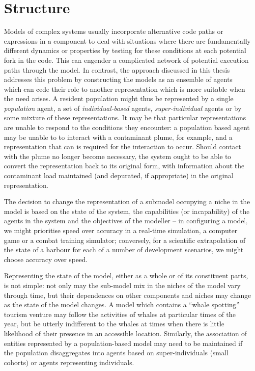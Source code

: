 \section{Structure }
Models of complex systems usually incorporate alternative code paths
or expressions in a component to deal with situations where there are
fundamentally different dynamics or properties by testing for these
conditions at each potential fork in the code. This can engender a
complicated network of potential execution paths through the model.
In contrast, the approach discussed in this thesis addresses this
problem by constructing the models as an ensemble of agents which can
cede their role to another representation which is more suitable when
the need arises.  A resident population might thus be represented by a
single \emph{population\/} agent, a set of \emph{individual-based\/}
agents, \emph{super-individual\/} agents or by some mixture of these
representations.  It may be that particular representations are unable
to respond to the conditions they encounter: a population based agent
may be unable to to interact with a contaminant plume, for example,
and a representation that can is required for the interaction to
occur.  Should contact with the plume no longer become necessary, the
system ought to be able to convert the representation back to its
original form, with information about the contaminant load maintained
(and depurated, if appropriate) in the original representation.

The decision to change the representation of a submodel occupying a
niche in the model is based on the state of the system, the
capabilities (or incapability) of the agents in the system and the
objectives of the modeller -- in configuring a model, we might
prioritise speed over accuracy in a real-time simulation, a computer
game or a combat training simulator; conversely, for a scientific
extrapolation of the state of a harbour for each of a number of
development scenarios, we might choose accuracy over speed.

Representing the state of the model, either as a whole or of its
constituent parts, is not simple: not only may the sub-model mix in
the niches of the model vary through time, but their dependences
on other components and niches may change as the state of the model
changes. A model which contains a ``whale spotting'' tourism venture
may follow the activities of whales at particular times of the year,
but be utterly indifferent to the whales at times when there is little
likelihood of their presence in an accessible location. Similarly, the
association of entities represented by a population-based model may
need to be maintained if the population dis\-aggregates into agents
based on super-individuals (small cohorts) or agents representing
individuals.


